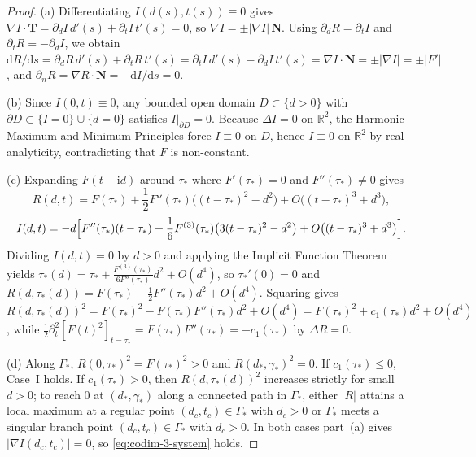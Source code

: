 \documentclass[11pt,reqno]{amsart}
\theoremstyle{definition}
\theoremstyle{remark}
\numberwithin{equation}{section}
\newcommand{\dd}{\mathrm{d}}
\newcommand{\ii}{\mathrm{i}}
\begin{document}
\begin{proof}
(a) Differentiating $I(d(s),t(s)) \equiv 0$ gives $\nabla I \cdot \mathbf{T} = \partial_d I\,d'(s) + \partial_t I\,t'(s) = 0$, so $\nabla I = \pm|\nabla I|\,\mathbf{N}$. Using $\partial_d R = \partial_t I$ and $\partial_t R = -\partial_d I$, we obtain $\dd R/\dd s = \partial_d R\,d'(s) + \partial_t R\,t'(s) = \partial_t I\,d'(s) - \partial_d I\,t'(s) = \nabla I \cdot \mathbf{N} = \pm|\nabla I| = \pm|F'|$, and $\partial_n R = \nabla R \cdot \mathbf{N} = -\dd I/\dd s = 0$.

(b) Since $I(0,t)\equiv 0$, any bounded open domain $D \subset \{d>0\}$ with $\partial D \subset \{I=0\}\cup\{d=0\}$ satisfies $I|_{\partial D} = 0$. Because $\Delta I = 0$ on $\mathbb{R}^2$, the Harmonic Maximum and Minimum Principles force $I \equiv 0$ on $D$, hence $I \equiv 0$ on $\mathbb{R}^2$ by real-analyticity, contradicting that $F$ is non-constant.

(c) Expanding $F(t-\ii d)$ around $\tau_*$ where $F'(\tau_*)=0$ and $F''(\tau_*)\ne 0$ gives
\[
R(d,t) = F(\tau_*) + \frac{1}{2}F''(\tau_*)\bigl((t-\tau_*)^2 - d^2\bigr) + O\bigl((t-\tau_*)^3 + d^3\bigr),
\]
\[
I(d,t) = -d\Bigl[F''(\tau_*)(t-\tau_*) + \frac{1}{6}F^{(3)}(\tau_*)\bigl(3(t-\tau_*)^2 - d^2\bigr) + O\bigl((t-\tau_*)^3 + d^3\bigr)\Bigr].
\]
Dividing $I(d,t)=0$ by $d>0$ and applying the Implicit Function Theorem yields $\tau_*(d) = \tau_* + \frac{F^{(3)}(\tau_*)}{6F''(\tau_*)}d^2 + O(d^4)$, so $\tau_*'(0)=0$ and $R(d,\tau_*(d)) = F(\tau_*) - \frac{1}{2}F''(\tau_*)d^2 + O(d^4)$. Squaring gives $R(d,\tau_*(d))^2 = F(\tau_*)^2 - F(\tau_*)F''(\tau_*)d^2 + O(d^4) = F(\tau_*)^2 + c_1(\tau_*)d^2 + O(d^4)$, while $\frac{1}{2}\partial_t^2[F(t)^2]_{t=\tau_*} = F(\tau_*)F''(\tau_*) = -c_1(\tau_*)$ by $\Delta R = 0$.

(d) Along $\Gamma_*$, $R(0,\tau_*)^2 = F(\tau_*)^2 > 0$ and $R(d_*,\gamma_*)^2 = 0$. If $c_1(\tau_*) \le 0$, Case~I holds. If $c_1(\tau_*) > 0$, then $R(d,\tau_*(d))^2$ increases strictly for small $d>0$; to reach $0$ at $(d_*,\gamma_*)$ along a connected path in $\Gamma_*$, either $|R|$ attains a local maximum at a regular point $(d_c,t_c) \in \Gamma_*$ with $d_c>0$ or $\Gamma_*$ meets a singular branch point $(d_c,t_c) \in \Gamma_*$ with $d_c>0$. In both cases part~(a) gives $|\nabla I(d_c,t_c)| = 0$, so \eqref{eq:codim-3-system} holds.
\end{proof}
\end{document}

